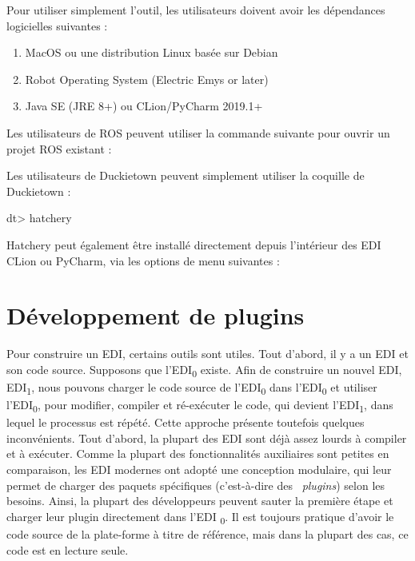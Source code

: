 {\noindent Pour utiliser simplement l'outil, les utilisateurs doivent avoir les dépendances logicielles suivantes :
%
\begin{enumerate}
\item MacOS ou une distribution Linux basée sur Debian
\item Robot Operating System (Electric Emys or later)
\item Java SE (JRE 8+) ou CLion/PyCharm 2019.1+
\end{enumerate}
%
\noindent Les utilisateurs de ROS peuvent utiliser la commande suivante pour ouvrir un projet ROS existant :
%
\begin{pclisting}
~$ git clone https://github.com/duckietown/hatchery && cd hatchery &&
./gradlew runIde [-Project="<ABSOLUTE_PATH_TO_ROS_PROJECT>"]].
\end{pclisting}
%
\noindent Les utilisateurs de Duckietown peuvent simplement utiliser la coquille de Duckietown :
%
\begin{dtslisting}
dt> hatchery
\end{dtslisting}
%
\noindent Hatchery peut également être installé directement depuis l'intérieur des EDI CLion ou PyCharm, via les options de menu suivantes : 

\section{Développement de plugins}

Pour construire un EDI, certains outils sont utiles. Tout d'abord, il y a un EDI et son code source. Supposons que l'EDI\textsubscript{0} existe. Afin de construire un nouvel EDI, EDI\textsubscript{1}, nous pouvons charger le code source de l'EDI\textsubscript{0} dans l'EDI\textsubscript{0} et utiliser l'EDI\textsubscript{0}, pour modifier, compiler et ré-exécuter le code, qui devient l'EDI\textsubscript{1}, dans lequel le processus est répété. Cette approche présente toutefois quelques inconvénients. Tout d'abord, la plupart des EDI sont déjà assez lourds à compiler et à exécuter. Comme la plupart des fonctionnalités auxiliaires sont petites en comparaison, les EDI modernes ont adopté une conception modulaire, qui leur permet de charger des paquets spécifiques (c'est-à-dire des \ \textit{plugins}) selon les besoins. Ainsi, la plupart des développeurs peuvent sauter la première étape et charger leur plugin directement dans l'EDI \textsubscript{0}. Il est toujours pratique d'avoir le code source de la plate-forme à titre de référence, mais dans la plupart des cas, ce code est en lecture seule.

}
